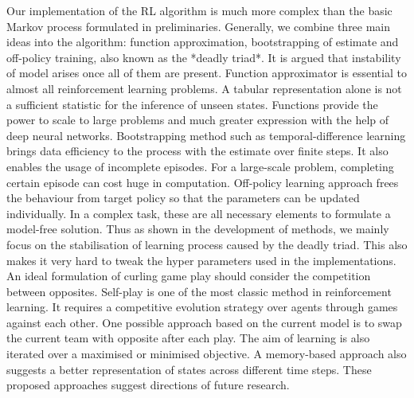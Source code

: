 \documentclass[oneside,11pt,a4paper]{article}
\begin{document}
\newline
\newline
\noindent
Our implementation of the RL algorithm is much more complex than the basic Markov process formulated in preliminaries. Generally, we combine three main ideas into the algorithm: function approximation, bootstrapping of estimate and off-policy training, also known as the *deadly triad*. It is argued that instability of model arises once all of them are present. Function approximator is essential to almost all reinforcement learning problems. A tabular representation alone is not a sufficient statistic for the inference of unseen states. Functions provide the power to scale to large problems and much greater expression with the help of deep neural networks. Bootstrapping method such as temporal-difference learning brings data efficiency to the process with the estimate over finite steps. It also enables the usage of incomplete episodes. For a large-scale problem, completing certain episode can cost huge in computation. Off-policy learning approach frees the behaviour from target policy so that the parameters can be updated individually. In a complex task, these are all necessary elements to formulate a model-free solution. Thus as shown in the development of methods, we mainly focus on the stabilisation of learning process caused by the deadly triad. This also makes it very hard to tweak the hyper parameters used in the implementations.
\newline
\newline
\noindent
An ideal formulation of curling game play should consider the competition between opposites. Self-play is one of the most classic method in reinforcement learning. It requires a competitive evolution strategy over agents through games against each other. One possible approach based on the current model is to swap the current team with opposite after each play. The aim of learning is also iterated over a maximised or minimised objective. A memory-based approach also suggests a better representation of states across different time steps. These proposed approaches suggest directions of future research.



\newpage
\end{document}
